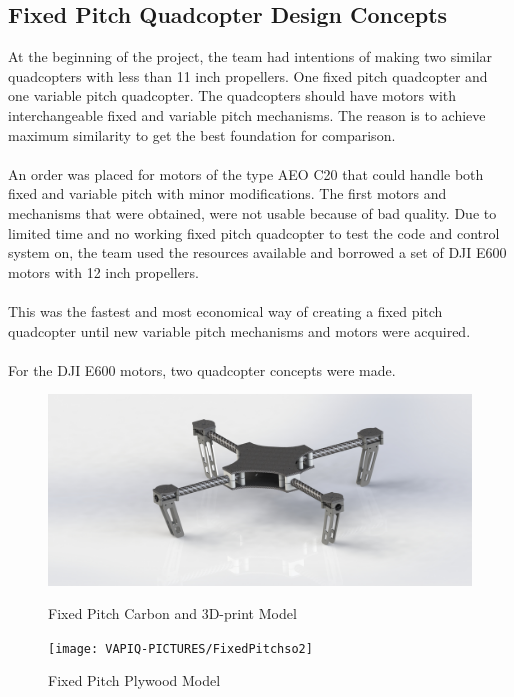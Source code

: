 \subsection{Fixed Pitch Quadcopter Design Concepts}
At the beginning of the project, the team had intentions of making two similar quadcopters with less than 11 inch propellers. One fixed pitch quadcopter and one variable pitch quadcopter. The quadcopters should have motors with interchangeable fixed and variable pitch mechanisms. The reason is to achieve maximum similarity to get the best foundation for comparison. 
\\\\
An order was placed for motors of the type AEO C20 that could handle both fixed and variable pitch with minor modifications. The first motors and mechanisms that were obtained, were not usable because of bad quality. Due to limited time and no working fixed pitch quadcopter to test the code and control system on, the team used the resources available and borrowed a set of DJI E600 motors with 12 inch propellers.
\\\\
This was the fastest and most economical way of creating a fixed pitch quadcopter until new variable pitch mechanisms and motors were acquired.
\\\\
For the DJI E600 motors, two quadcopter concepts were made. 
\begin{figure}[h]
        \centering
         \begin{minipage}[b]{0.45\textwidth}
            \includegraphics[width = 1\textwidth]{VAPIQ-PICTURES/FixedPitchConceptCarbon}
              \caption{Fixed Pitch Carbon and 3D-print Model}
            \label{fig:CarbonFPQ}
        \end{minipage}
        \hfill
        \begin{minipage}[b]{0.45\textwidth}
            \texttt{[image: VAPIQ-PICTURES/FixedPitchso2]}
            \caption{Fixed Pitch Plywood Model}
            \label{fig:FPQply}
        \end{minipage}
\end{figure}

